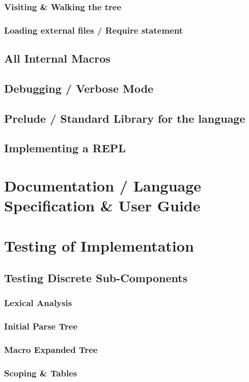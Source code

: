 \documentclass{article}
\begin{document}
    \subsubsection{Visiting \& Walking the tree}
    \subsubsection{Loading external files / Require statement}
  \subsection{All Internal Macros}
  \subsection{Debugging / Verbose Mode}
  \subsection{Prelude / Standard Library for the language}
  \subsection{Implementing a REPL}

\section{Documentation / Language Specification \& User Guide}

\section{Testing of Implementation}
  \subsection{Testing Discrete Sub-Components}
    \subsubsection{Lexical Analysis}
    \subsubsection{Initial Parse Tree}
    \subsubsection{Macro Expanded Tree}
    \subsubsection{Scoping \& Tables}
\end{document}
